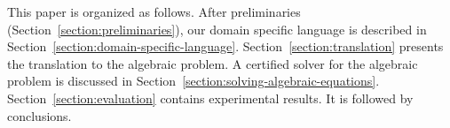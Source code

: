 


This paper is organized as follows. After preliminaries
(Section~\ref{section:preliminaries}), our domain specific
language is described in Section~\ref{section:domain-specific-language}. 
Section~\ref{section:translation}
presents the translation to the algebraic
problem. A certified solver for the algebraic problem is discussed in
Section~\ref{section:solving-algebraic-equations}. 
Section~\ref{section:evaluation} contains experimental results. It is
followed by conclusions.

